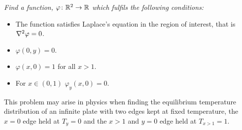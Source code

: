 \documentclass{article}
\begin{document}
    \begin{example}
        \itshape
        Find a function, \(\varphi\colon\mathbb{R}^2 \to \mathbb{R}\) which fulfils the following conditions:
        \begin{itemize}
            \item The function satisfies Laplace's equation in the region of interest, that is \(\nabla^2\varphi = 0\).
            \item \(\varphi(0, y) = 0\).
            \item \(\varphi(x, 0) = 1\) for all \(x > 1\).
            \item For \(x \in (0, 1)\) \(\varphi_y(x, 0) = 0\).
        \end{itemize}
        This problem may arise in physics when finding the equilibrium temperature distribution of an infinite plate with two edges kept at fixed temperature, the \(x = 0\) edge held at \(T_y = 0\) and the \(x > 1\) and \(y = 0\) edge held at \(T_{x>1} = 1\).
        

\end{example}
\end{document}
